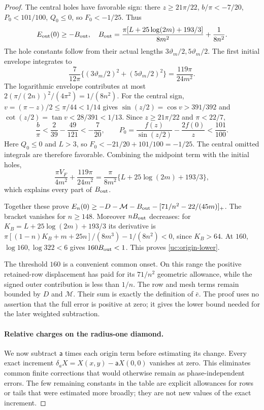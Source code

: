 \begin{proof}
The central holes have favorable sign: there $z\geq21\pi/22$,
$b/\pi<-7/20$, $P_0<101/100$, $Q_0\leq0$, so $F_0<-1/25$.
Thus
\[
 E_{\rm out}(0)\geq-B_{\rm out},\quad
 B_{\rm out}=\frac{\pi[L+25\log(2m)+193/3]}{8m^2}+\frac1{8n^2}.
\]
The hole constants follow from their actual lengths $3\vartheta_m/2,5\vartheta_m/2$.
The first initial envelope integrates to
\[
 \frac{7}{12\pi}\{(3\vartheta_m/2)^2+(5\vartheta_m/2)^2\}
 =\frac{119\pi}{24m^2}.
\]
The logarithmic envelope contributes at most
$2(\pi/(2n))^2/(4\pi^2)=1/(8n^2)$.
For the central sign, $v=(\pi-z)/2\leq\pi/44<1/14$ gives
$\sin(z/2)=\cos v>391/392$ and
$\cot(z/2)=\tan v<28/391<1/13$.
Since $z\geq21\pi/22$ and $\pi<22/7$,
\[
 \frac b\pi<\frac2{39}-\frac{49}{121}<-\frac7{20},
 \qquad P_0=\frac{f(z)}{\sin(z/2)}-\frac{2f(0)}z<\frac{101}{100}.
\]
Here $Q_0\leq0$ and $L>3$, so
$F_0<-21/20+101/100=-1/25$. The central omitted integrals are
therefore favorable. Combining the midpoint term with the initial holes,
\[
 \frac{\pi V_F}{4m^2}+\frac{119\pi}{24m^2}
 =\frac\pi{8m^2}\{L+25\log(2m)+193/3\},
\]
which explains every part of $B_{\rm out}$.

Together these prove
$E_n(0)\geq-D-\mathcal M-B_{\rm out}-[71/n^2-22/(45m)]_+$.
The bracket vanishes for $n\geq148$. Moreover $nB_{\rm out}$ decreases:
for $K_B=L+25\log(2m)+193/3$ its derivative is
$\pi[(1-n)K_B+m+25n]/(8m^3)-1/(8n^2)<0$, since $K_B>64$.
At $160$, $\log160,\log322<6$ gives $160B_{\rm out}<1$.
This proves \eqref{uc:origin-lower}.

The threshold $160$ is a convenient common onset. On this range
the positive retained-row displacement has paid for its $71/n^2$
geometric allowance, while the signed outer contribution is less than
$1/n$. The row and mesh terms remain bounded by $D$ and
$\mathcal M$. Their sum is exactly the definition of $\bar e$.
The proof uses no assertion that the full error is positive at zero;
it gives the lower bound needed for the later weighted subtraction.

\paragraph{Relative charges on the radius-one diamond.}

We now subtract $\mathsf{a}$ times each origin term before estimating its
change. Every exact increment $\delta_aX=X(x,y)-\mathsf{a}X(0,0)$ vanishes
at zero. This eliminates common finite corrections that would otherwise
remain as phase-independent errors. The few remaining constants in the
table are explicit allowances for rows or tails that were estimated
more broadly; they are not new values of the exact increment.


\end{proof}
